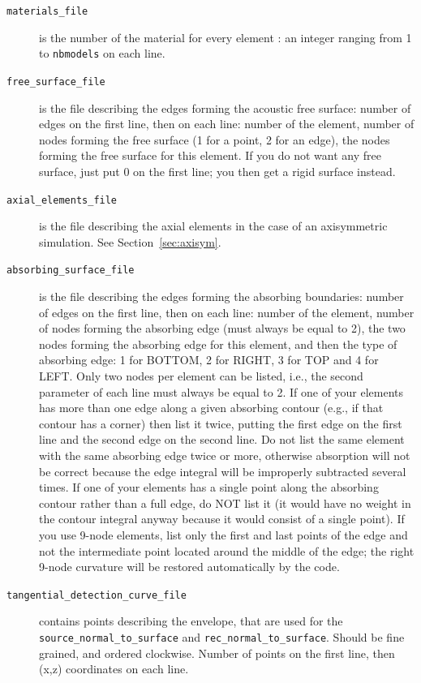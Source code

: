 \begin{description}
\begin{description}
     \item[{\texttt{materials\_file}}] is the number of the material for every element : an integer ranging from 1 to \texttt{nbmodels} on each line.

     \item[{\texttt{free\_surface\_file}}] is the file describing the edges forming the acoustic free surface: number of edges on the first line, then on each line: number of the element, number of nodes forming the free surface (1 for a point, 2 for an edge), the nodes forming the free surface for this element. If you do not want any free surface, just put 0 on the first line; you then get a rigid surface instead.

     \item[{\texttt{axial\_elements\_file}}] is the file describing the axial elements in the case of an axisymmetric simulation. See Section~\ref{sec:axisym}.

     \item[{\texttt{absorbing\_surface\_file}}] is the file describing the edges forming the absorbing boundaries:
number of edges on the first line, then on each line: number of the element, number of nodes forming the absorbing edge (must always be equal to 2),
the two nodes forming the absorbing edge for this element, and then the type of absorbing edge: 1 for BOTTOM, 2 for RIGHT, 3 for TOP and 4 for LEFT.
Only two nodes per element can be listed, i.e., the second parameter of each line must always be equal to 2.
If one of your elements has more than one edge along a given absorbing contour
(e.g., if that contour has a corner) then list it twice,
putting the first edge on the first line and the second edge on the second line.
Do not list the same element with the same absorbing edge twice or more, otherwise absorption will not be correct because the edge integral
will be improperly subtracted several times.
If one of your elements has a single point along the absorbing contour rather than a full edge, do NOT list it
(it would have no weight in the contour integral anyway because it would consist of a single point).
If you use 9-node elements, list only the first and last points of the edge and not the intermediate point
located around the middle of the edge; the right 9-node curvature will be restored automatically by the code.

     \item[{\texttt{tangential\_detection\_curve\_file}}] contains points describing the envelope, that are used for the \texttt{source\_normal\_to\_surface} and \texttt{rec\_normal\_to\_surface}. Should be fine grained, and ordered clockwise. Number of points on the first line, then (x,z) coordinates on each line.
  \end{description}



\end{description}
